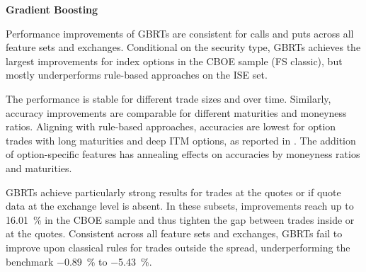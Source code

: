 
\textbf{Gradient Boosting}

Performance improvements of \glspl{GBRT} are consistent for calls and puts across all feature sets and exchanges. Conditional on the security type, \glspl{GBRT} achieves the largest improvements for index options in the \gls{CBOE} sample (\gls{FS} classic), but mostly underperforms rule-based approaches on the \gls{ISE} set.

The performance is stable for different trade sizes and over time. Similarly, accuracy improvements are comparable for different maturities and moneyness ratios. Aligning with rule-based approaches, accuracies are lowest for option trades with long maturities and deep \gls{ITM} options, as reported in \textcite[][22]{grauerOptionTradeClassification2022}. The addition of option-specific features has annealing effects on accuracies by moneyness ratios and maturities.

\glspl{GBRT} achieve particularly strong results for trades at the quotes or if quote data at the exchange level is absent. In these subsets, improvements reach up to \SI{16.01}{\percent} in the \gls{CBOE} sample and thus tighten the gap between trades inside or at the quotes. Consistent across all feature sets and exchanges, \glspl{GBRT} fail to improve upon classical rules for trades outside the spread, underperforming the benchmark \SI{-0.89}{\percent} to \SI{-5.43}{\percent}. %

